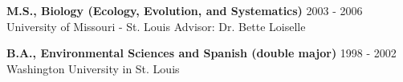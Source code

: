\documentclass[11pt,english]{article}\usepackage[]{graphicx}\usepackage[]{color}
\begin{document}
\begin{flushleft}
{\bf M.S., Biology (Ecology, Evolution, and Systematics)} \hfill {2003 - 2006} \newline
University of Missouri - St. Louis \newline
Advisor: Dr. Bette Loiselle
\vspace{0.5ex}

{\bf B.A., Environmental Sciences and Spanish (double major)} \hfill {1998 - 2002} \newline
Washington University in St. Louis
\end{flushleft}


\end{document}
